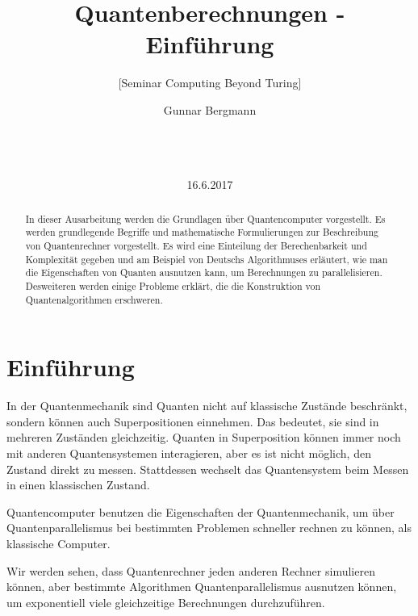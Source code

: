 \documentclass{acm_proc_article-sp}
\begin{document}
\title{Quantenberechnungen - Einführung}
\subtitle{[Seminar Computing Beyond Turing]}
\author{\alignauthor
Gunnar Bergmann\\
       \\ 
       \\
       \\ 
}

\date{16.6.2017}

\maketitle
\begin{abstract}

In dieser Ausarbeitung werden die Grundlagen über Quantencomputer vorgestellt.
Es werden grundlegende Begriffe und mathematische Formulierungen zur Beschreibung von
Quantenrechner vorgestellt.
Es wird eine Einteilung der Berechenbarkeit und Komplexität gegeben und am Beispiel von Deutschs Algorithmuses erläutert, wie man die Eigenschaften von Quanten ausnutzen kann, um Berechnungen zu parallelisieren.
Desweiteren werden einige Probleme erklärt, die die Konstruktion von Quantenalgorithmen erschweren.

\end{abstract}

\section{Einführung}


In der Quantenmechanik sind Quanten nicht auf klassische Zustände beschränkt, sondern können auch Superpositionen einnehmen.
Das bedeutet, sie sind in mehreren Zuständen gleichzeitig. Quanten in Superposition können immer noch mit anderen
Quantensystemen interagieren, aber es ist nicht möglich, den Zustand direkt zu messen. Stattdessen wechselt das 
Quantensystem beim Messen in einen klassischen Zustand.

Quantencomputer benutzen die Eigenschaften der Quantenmechanik, um über Quantenparallelismus bei bestimmten Problemen
schneller rechnen zu können, als klassische Computer.

Wir werden sehen, dass Quantenrechner jeden anderen Rechner simulieren können, aber bestimmte Algorithmen Quantenparallelismus ausnutzen können, um exponentiell viele gleichzeitige Berechnungen durchzuführen.
\end{document}
